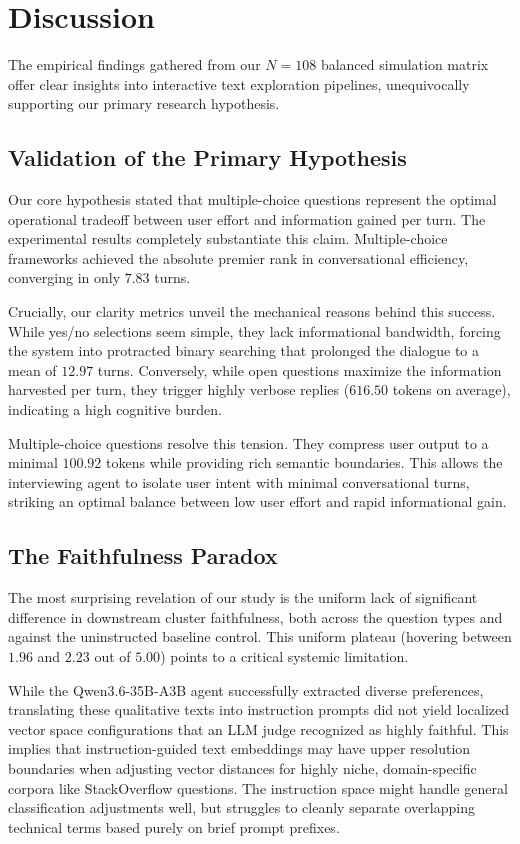 \section{Discussion}
\label{sec:discussion}

The empirical findings gathered from our $N=108$ balanced simulation matrix offer clear insights into interactive text exploration pipelines, unequivocally supporting our primary research hypothesis.

\subsection{Validation of the Primary Hypothesis}
Our core hypothesis stated that multiple-choice questions represent the optimal operational tradeoff between user effort and information gained per turn. 
The experimental results completely substantiate this claim. 
Multiple-choice frameworks achieved the absolute premier rank in conversational efficiency, converging in only $7.83$ turns. 

Crucially, our clarity metrics unveil the mechanical reasons behind this success. 
While yes/no selections seem simple, they lack informational bandwidth, forcing the system into protracted binary searching that prolonged the dialogue to a mean of $12.97$ turns. 
Conversely, while open questions maximize the information harvested per turn, they trigger highly verbose replies ($616.50$ tokens on average), indicating a high cognitive burden. 

Multiple-choice questions resolve this tension. 
They compress user output to a minimal $100.92$ tokens while providing rich semantic boundaries. 
This allows the interviewing agent to isolate user intent with minimal conversational turns, striking an optimal balance between low user effort and rapid informational gain.

\subsection{The Faithfulness Paradox}
The most surprising revelation of our study is the uniform lack of significant difference in downstream cluster faithfulness, both across the question types and against the uninstructed baseline control. 
This uniform plateau (hovering between $1.96$ and $2.23$ out of $5.00$) points to a critical systemic limitation. 

While the Qwen3.6-35B-A3B agent successfully extracted diverse preferences, translating these qualitative texts into instruction prompts did not yield localized vector space configurations that an LLM judge recognized as highly faithful. 
This implies that instruction-guided text embeddings may have upper resolution boundaries when adjusting vector distances for highly niche, domain-specific corpora like StackOverflow questions. 
The instruction space might handle general classification adjustments well, but struggles to cleanly separate overlapping technical terms based purely on brief prompt prefixes.

